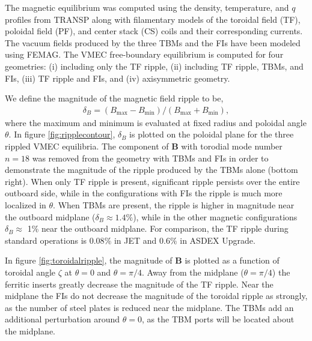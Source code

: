 \documentclass[aip, pop, preprint]{revtex4-1}
\numberwithin{figure}{section}
\numberwithin{equation}{section}
\begin{document}
The magnetic equilibrium was computed using the density, temperature, and $q$ profiles from TRANSP along with filamentary models of the toroidal field (TF), poloidal field (PF), and center stack (CS) coils and their corresponding currents. The vacuum fields produced by the three TBMs and the FIs have been modeled using FEMAG.\cite{Shinohara2009} The VMEC free-boundary equilibrium \cite{Hirshman1986} is computed for four geometries: (i) including only the TF ripple, (ii) including TF ripple, TBMs, and FIs, (iii) TF ripple and FIs, and (iv) axisymmetric geometry.  

We define the magnitude of the magnetic field ripple to be,
\begin{gather}
\delta_B = (B_{\text{max}}-B_{\text{min}})/(B_{\text{max}} + B_{\text{min}}), 
\end{gather}
where the maximum and minimum is evaluated at fixed radius and poloidal angle $\theta$. In figure \ref{fig:ripplecontour}, $\delta_B$ is plotted on the poloidal plane for the three rippled VMEC equilibria. The component of $\bm{B}$ with torodial mode number $n = 18$ was removed from the geometry with TBMs and FIs in order to demonstrate the magnitude of the ripple produced by the TBMs alone (bottom right). When only TF ripple is present, significant ripple persists over the entire outboard side, while in the configurations with FIs the ripple is much more localized in $\theta$. When TBMs are present, the ripple is higher in magnitude near the outboard midplane ($\delta_B \approx 1.4\%$), while in the other magnetic configurations $\delta_B \approx$ 1\% near the outboard midplane. For comparison, the TF ripple during standard operations is $0.08\%$ in JET \cite{DeVries2008} and $0.6\%$ in ASDEX Upgrade.\cite{Martitsch2016} 

In figure \ref{fig:toroidalripple}, the magnitude of $\bm{B}$ is plotted as a function of toroidal angle $\zeta$ at $\theta = 0$ and $\theta = \pi/4$. Away from the midplane ($\theta = \pi/4$) the ferritic inserts greatly decrease the magnitude of the TF ripple. Near the midplane the FIs do not decrease the magnitude of the toroidal ripple as strongly, as the number of steel plates is reduced near the midplane.\cite{Shinohara2009} The TBMs add an additional perturbation around $\theta = 0$, as the TBM ports will be located about the midplane. 

\FloatBarrier
\end{document}
